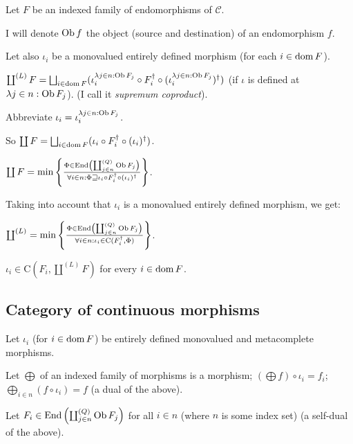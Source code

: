 Let $F$ be an indexed family of endomorphisms of $\mathcal{C}$.

I will denote $\operatorname{Ob} f$ the object (source and destination) of an
endomorphism $f$.

Let also $\iota_i$ be a monovalued entirely defined morphism (for each $i \in
\operatorname{dom} F$).

\begin{defn}
  $\coprod^{(L)} F = \bigsqcup_{i \in \dom F} (\iota^{\lambda j \in n :
  \Ob F_j}_i \circ F_i^{\dagger} \circ (\iota^{\lambda j \in n :
  \Ob F_j}_i)^{\dagger})$ (if $\iota$ is defined at $\lambda j \in n :
  \operatorname{Ob} F_j$). (I call it \emph{supremum coproduct}).
\end{defn}

Abbreviate $\iota_i = \iota^{\lambda j \in n : \operatorname{Ob} F_j}_i$.

So $\coprod F = \bigsqcup_{i \in \dom F} (\iota_i \circ F_i^{\dagger}
\circ (\iota_i)^{\dagger})$.

$\coprod F = \min \left\{ \frac{ \Phi \in \operatorname{End} \left( \coprod^{(Q)}_{j \in n}
\operatorname{Ob} F_j \right) }{ \forall i \in n : \Phi
\sqsupseteq \iota_i \circ F_i^{\dagger} \circ (\iota_i)^{\dagger} }\right\}$.

Taking into account that $\iota_i$ is a monovalued entirely defined morphism,
we get:

\begin{obvious}
$\coprod^{(L)} = \min \left\{ \frac{ \Phi \in \operatorname{End} \left( \coprod^{(Q)}_{j \in
n} \operatorname{Ob} F_j \right) }{ \forall i \in n : \iota_i
\in \mathrm{C} (F_i^{\dagger} , \Phi) }\right\}$.{\hspace*{\fill}}{\medskip}
\end{obvious}

\begin{cor}
  $\iota_i \in \mathrm{C} \left( F_i , \coprod^{(L)} F \right)$ for every $i
  \in \operatorname{dom} F$.
\end{cor}

\subsection{Category of continuous morphisms}

Let $\iota_i$ (for $i \in \operatorname{dom} F$) be entirely defined monovalued and
metacomplete morphisms.

Let $\bigoplus$ of an indexed family of morphisms is a morphism; $\left(
\bigoplus f \right) \circ \iota_i = f_i$; $\bigoplus_{i \in n} (f \circ
\iota_i) = f$ (a dual of the above).

Let $F_i \in \operatorname{End} \left( \coprod^{(Q)}_{j \in n} \operatorname{Ob} F_j \right)$
for all $i \in n$ (where $n$ is some index set) (a self-dual of the above).

